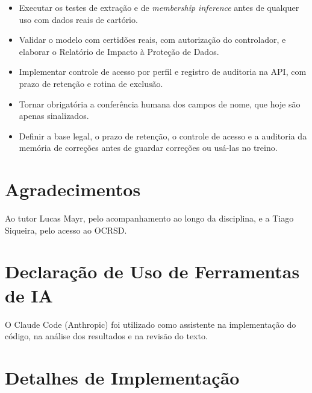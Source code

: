 \begin{itemize}
    \item Executar os testes de extração e de \emph{membership inference} antes de qualquer uso com dados reais de cartório.
    \item Validar o modelo com certidões reais, com autorização do controlador, e elaborar o Relatório de Impacto à Proteção de Dados.
    \item Implementar controle de acesso por perfil e registro de auditoria na API, com prazo de retenção e rotina de exclusão.
    \item Tornar obrigatória a conferência humana dos campos de nome, que hoje são apenas sinalizados.
    \item Definir a base legal, o prazo de retenção, o controle de acesso e a auditoria da memória de correções antes de guardar correções ou usá-las no treino.
\end{itemize}


\section*{Agradecimentos}
Ao tutor Lucas Mayr, pelo acompanhamento ao longo da disciplina, e a Tiago Siqueira, pelo acesso ao OCRSD.

\section*{Declaração de Uso de Ferramentas de IA}
O Claude Code (Anthropic) foi utilizado como assistente na implementação do código, na análise dos resultados e na revisão do texto.

\pocreferencias

\pocapendices


\section{Detalhes de Implementação}
\label{app:implementacao}

